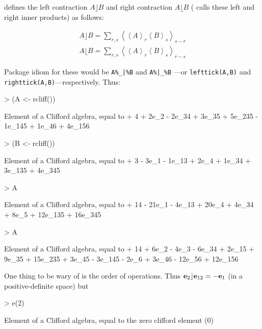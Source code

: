 \documentclass{article}
\begin{document}
\cite{dorst2002} defines the left contraction $A\rfloor B$ and right
contraction $A\lfloor B$ (\cite{chisholm2012} calls these left and
right inner products) as follows:

\begin{eqnarray}
\displaystyle A\rfloor B = \sum_{r,s}\left\langle\left\langle
A\right\rangle_r\left\langle B\right\rangle_s\right\rangle_{s-r}\\
\displaystyle A\lfloor B = \sum_{r,s}\left\langle\left\langle
A\right\rangle_r\left\langle B\right\rangle_s\right\rangle_{r-s}
\end{eqnarray}


Package idiom for these would be {\tt A\%\_|\%B} and {\tt A\%|\_\%B}
---or {\tt lefttick(A,B)} and {\tt righttick(A,B)}---respectively.
Thus:

\begin{Schunk}
\begin{Sinput}
> (A <- rcliff())
\end{Sinput}
\begin{Soutput}
Element of a Clifford algebra, equal to
+ 4 + 2e_2 - 2e_34 + 3e_35 + 5e_235 - 1e_145 + 1e_46 + 4e_156
\end{Soutput}
\begin{Sinput}
> (B <- rcliff())
\end{Sinput}
\begin{Soutput}
Element of a Clifford algebra, equal to
+ 3 - 3e_1 - 1e_13 + 2e_4 + 1e_34 + 3e_135 + 4e_345
\end{Soutput}
\begin{Sinput}
> A %
\end{Sinput}
\begin{Soutput}
Element of a Clifford algebra, equal to
+ 14 - 21e_1 - 4e_13 + 20e_4 + 4e_34 + 8e_5 + 12e_135 + 16e_345
\end{Soutput}
\begin{Sinput}
> A %
\end{Sinput}
\begin{Soutput}
Element of a Clifford algebra, equal to
+ 14 + 6e_2 - 4e_3 - 6e_34 + 2e_15 + 9e_35 + 15e_235 + 3e_45 - 3e_145 - 2e_6 +
3e_46 - 12e_56 + 12e_156
\end{Soutput}
\end{Schunk}

One thing to be wary of is the order of operations.  Thus
${\bf e}_{2}\rfloor{\bf e}_{12}=-{\bf e}_{1}$ (in a positive-definite space) but

\begin{Schunk}
\begin{Sinput}
> e(2) %
\end{Sinput}
\begin{Soutput}
Element of a Clifford algebra, equal to
the zero clifford element (0)
\end{Soutput}
\end{Schunk}
\end{document}
